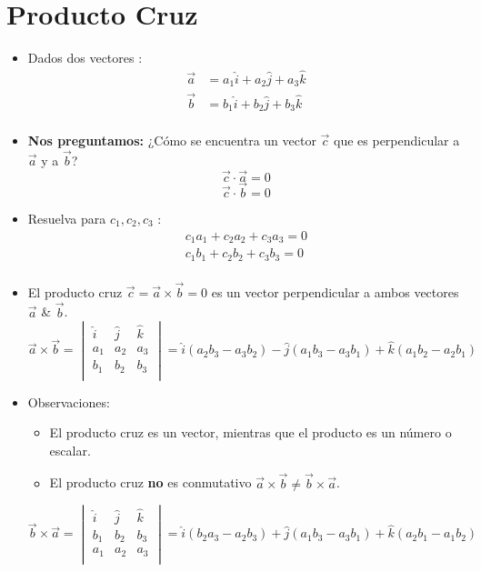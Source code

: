\documentclass{article}
\begin{document}
\section{Producto Cruz}
\begin{itemize}
    \item Dados dos vectores :
        \begin{align*}
            \vec{a} & = a_1 \hat{i}  + a_2 \hat{j} + a_3 \hat{k} \\ 
            \vec{b} & = b_1 \hat{i} + b_2 \hat{j} + b_3 \hat{k} \\ 
        \end{align*}
    
    \item \textbf{Nos preguntamos:} ¿Cómo se encuentra un vector $\vec{c}$  que es perpendicular a $\vec{a}$ y a $\vec{b}$?
        \[
          \vec{c} \cdot \vec{a} = 0 
        \]
        \[
          \vec{c} \cdot \vec{b} = 0 
        \]
    
    \item Resuelva para $c_1,c_2,c_3$ :
        \begin{align*}
            c_1a_1+c_2a_2+c_3a_3=0\\ 
            c_1b_1+c_2b_2+c_3b_3=0\\ 
        \end{align*}
    
    \item El producto cruz $\vec{c}= \vec{a} \times \vec{b} = 0$ es un vector perpendicular a ambos vectores $\vec{a}$ \& $\vec{b}$.
        \begin{equation*}
            \vec{a}\times \vec{b} = \begin{vmatrix}
                \hat{i} & \hat{j} & \hat{k} \\ 
                a_1 & a_2 & a_3 \\ 
                b_1 & b_2 & b_3 \\ 
            \end{vmatrix} = \hat{i}(a_2b_3 - a_3b_2) - \hat{j}(a_1b_3-a_3b_1)+\hat{k}(a_1b_2-a_2b_1) 
        \end{equation*}
    
    \item Observaciones:
        \begin{itemize}
            \item El producto cruz es un vector, mientras que el producto es un número o escalar.
            \item El producto cruz \textbf{no} es conmutativo $\vec{a}\times \vec{b} \neq \vec{b}\times \vec{a}$.
        \end{itemize}
        \begin{equation*}
            \vec{b}\times \vec{a} = \begin{vmatrix}
                \hat{i} & \hat{j} & \hat{k} \\ 
                b_1 & b_2 & b_3 \\ 
                a_1 & a_2 & a_3 \\ 
            \end{vmatrix} = \hat{i}(b_2a_3-a_2b_3)+\hat{j}(a_1b_3-a_3b_1)+\hat{k}(a_2b_1-a_1b_2)
        \end{equation*}
    

\end{itemize}
\end{document}
